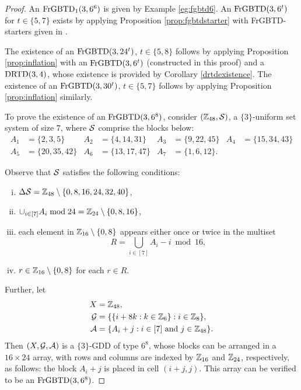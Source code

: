 \documentclass[draft, 11pt]{article}
\begin{document}
\begin{proof}
An ${\rm FrGBTD}_1(3,6^6)$ is given by Example \ref{eg:fgbtd6}.
An ${\rm FrGBTD}(3,6^t)$ for $t\in\{5,7\}$ exists by
applying Proposition \ref{prop:fgbtdstarter} with FrGBTD-starters given in \cite{Cheeetal:2012online}.

The existence of an ${\rm FrGBTD}(3,24^t)$, $t\in\{5,8\}$ follows by applying
Proposition \ref{prop:inflation} with an ${\rm FrGBTD}(3,6^t)$ (constructed in this proof)
and a ${\rm DRTD}(3,4)$, whose existence is provided by Corollary \ref{drtdexistence}.
The existence of an ${\rm FrGBTD}(3,30^t)$, $t\in\{5,7\}$ follows by
applying Proposition \ref{prop:inflation} similarly.

To prove the existence of an ${\rm FrGBTD}(3,6^8)$, consider $(\mathbb Z_{48},\mathcal S)$, a $\{3\}$-uniform set system of size $7$, where $\mathcal S$ comprise
the blocks below:
\begin{align*}
A_{1}&=\{2,3,5\}&  
A_{2}&=\{4,14,31\} &  
A_{3}&=\{9,22,45\}&
A_{4}&=\{15,34,43\} \\  
A_{5}&=\{20,35,42\} &  
A_{6}&=\{13,17,47\}&
A_{7}&=\{1,6,12\}.
\end{align*}

\noindent Observe that $\mathcal S$ satisfies the following conditions:
\begin{enumerate}[(i)]
\item $\Delta\mathcal S=\mathbb Z_{48}\setminus\{0,8,16,24,32,40\}$,
\item $\cup_{i\in [7]} A_i\bmod 24 = \mathbb Z_{24}\setminus\{0,8,16\}$,
\item each element in $\mathbb Z_{16}\setminus\{0,8\}$ appears either once or twice in the multiset
\begin{equation*}
R = \bigcup_{i\in [7]} A_i-i\bmod {16},
\end{equation*}
\item $r\in \mathbb Z_{16}\setminus\{0,8\}$ for each $r\in R$.
\end{enumerate}

 Further, let \begin{align*}
 X &= \mathbb Z_{48},\\
 \mathcal G &= \{ \{i+8k: k\in\mathbb Z_6\} : i\in\mathbb Z_8\}, \\
 \mathcal A &=\{A_i+j: \text{$i\in [7]$ and $j\in\mathbb Z_{48}$}\}.
 \end{align*}
 Then $(X,\mathcal G,\mathcal A)$ is a $\{3\}$-GDD of type $6^8$, whose blocks can be arranged in a $16\times 24$ array,
 with rows and columns are indexed by $\mathbb Z_{16}$ and $\mathbb Z_{24}$, respectively, as follows: the block $A_i+j$ is placed in cell $(i+j,j)$.
 This array can be verified to be an ${\rm FrGBTD}(3,6^8)$.
 \end{proof}
\end{document}
